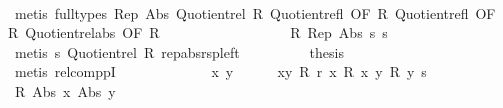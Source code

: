 \begin{isabellebody}
\ \ \ \ \ \ \ \ \isamarkupfalse%
\ {\isacharparenleft}{\kern0pt}metis\ {\isacharparenleft}{\kern0pt}full{\isacharunderscore}{\kern0pt}types{\isacharparenright}{\kern0pt}\ Rep{}\ Abs{}\ Quotient{}{\isacharunderscore}{\kern0pt}rel\ R{}\ Quotient{}{\isacharunderscore}{\kern0pt}refl{}\ {\isacharbrackleft}{\kern0pt}OF\ R{}{\isacharbrackright}{\kern0pt}\ Quotient{}{\isacharunderscore}{\kern0pt}refl{}\ {\isacharbrackleft}{\kern0pt}OF\ R{}{\isacharbrackright}{\kern0pt}\ Quotient{}{\isacharunderscore}{\kern0pt}rel{\isacharunderscore}{\kern0pt}abs\ {\isacharbrackleft}{\kern0pt}OF\ R{}{\isacharbrackright}{\kern0pt}{\isacharparenright}{\kern0pt}\isanewline
\ \ \ \ \ \ \ \ \isamarkupfalse%
\isanewline
\ \ \ \ \ \ \isamarkupfalse%
\ \isamarkupfalse%
\ {\isachardoublequoteopen}R{}\ {\isacharparenleft}{\kern0pt}Rep{}\ {\isacharparenleft}{\kern0pt}Abs{}\ s{\isacharparenright}{\kern0pt}{\isacharparenright}{\kern0pt}\ s{\isachardoublequoteclose}\isanewline
\ \ \ \ \ \ \ \ \isamarkupfalse%
\ {\isacharparenleft}{\kern0pt}metis\ s\ Quotient{}{\isacharunderscore}{\kern0pt}rel\ R{}\ rep{\isacharunderscore}{\kern0pt}abs{\isacharunderscore}{\kern0pt}rsp{\isacharunderscore}{\kern0pt}left{\isacharparenright}{\kern0pt}\isanewline
\ \ \ \ \ \ \isamarkupfalse%
\ \isamarkupfalse%
\ {\isacharquery}{\kern0pt}thesis\isanewline
\ \ \ \ \ \ \ \ \isamarkupfalse%
\ {\isacharparenleft}{\kern0pt}metis\ relcomppI{\isacharparenright}{\kern0pt}\isanewline
\ \ \ \ \isamarkupfalse%
\isanewline
\ \ \isamarkupfalse%
\isanewline
\ \ \ \ \isamarkupfalse%
\ x\ y\isanewline
\ \ \ \ \isamarkupfalse%
\ xy{\isacharcolon}{\kern0pt}\ {\isachardoublequoteopen}R{}\ r\ x{\isachardoublequoteclose}\ {\isachardoublequoteopen}R{}{\isacharprime}{\kern0pt}\ x\ y{\isachardoublequoteclose}\ {\isachardoublequoteopen}R{}\ y\ s{\isachardoublequoteclose}\isanewline
\ \ \ \ \isamarkupfalse%
\ \isamarkupfalse%
\ {\isachardoublequoteopen}R{}\ {\isacharparenleft}{\kern0pt}Abs{}\ x{\isacharparenright}{\kern0pt}\ {\isacharparenleft}{\kern0pt}Abs{}\ y{\isacharparenright}{\kern0pt}{\isachardoublequoteclose}\isanewline
\ \ \ \ \ \ \isamarkupfalse%

\end{isabellebody}
